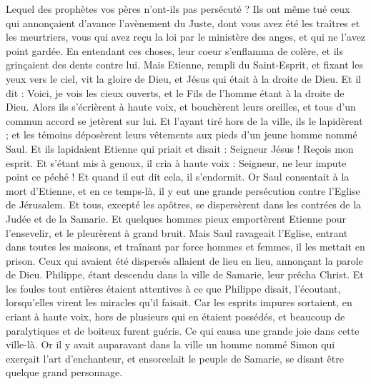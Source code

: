 \begin{multicols}{2}
Lequel des prophètes vos pères n'ont-ils pas persécuté ? Ils ont même tué ceux qui annonçaient d'avance l'avènement du Juste, dont vous avez été les traîtres et les meurtriers,
vous qui avez reçu la loi par le ministère des anges, et qui ne l'avez point gardée.
En entendant ces choses, leur coeur s'enflamma de colère, et ils grinçaient des dents contre lui.
Mais Etienne, rempli du Saint-Esprit, et fixant les yeux vers le ciel, vit la gloire de Dieu, et Jésus qui était à la droite de Dieu.
Et il dit : Voici, je vois les cieux ouverts, et le Fils de l'homme étant à la droite de Dieu.
Alors ils s'écrièrent à haute voix, et bouchèrent leurs oreilles, et tous d'un commun accord se jetèrent sur lui.
Et l'ayant tiré hors de la ville, ils le lapidèrent ; et les témoins déposèrent leurs vêtements aux pieds d'un jeune homme nommé Saul.
Et ils lapidaient Etienne qui priait et disait : Seigneur Jésus ! Reçois mon esprit.
Et s'étant mis à genoux, il cria à haute voix : Seigneur, ne leur impute point ce péché ! Et quand il eut dit cela, il s'endormit.
\VerseOne{}Or Saul consentait à la mort d'Etienne, et en ce temps-là, il y eut une grande persécution contre l'Eglise de Jérusalem. Et tous, excepté les apôtres, se dispersèrent dans les contrées de la Judée et de la Samarie.
Et quelques hommes pieux emportèrent Etienne pour l'ensevelir, et le pleurèrent à grand bruit.
Mais Saul ravageait l'Eglise, entrant dans toutes les maisons, et traînant par force hommes et femmes, il les mettait en prison.
Ceux qui avaient été dispersés allaient de lieu en lieu, annonçant la parole de Dieu.
Philippe, étant descendu dans la ville de Samarie, leur prêcha Christ.
Et les foules tout entières étaient attentives à ce que Philippe disait, l'écoutant, lorsqu'elles virent les miracles qu'il faisait.
Car les esprits impures sortaient, en criant à haute voix, hors de plusieurs qui en étaient possédés, et beaucoup de paralytiques et de boiteux furent guéris.
Ce qui causa une grande joie dans cette ville-là.
Or il y avait auparavant dans la ville un homme nommé Simon qui exerçait l'art d'enchanteur, et ensorcelait le peuple de Samarie, se disant être quelque grand personnage.

\end{multicols}
